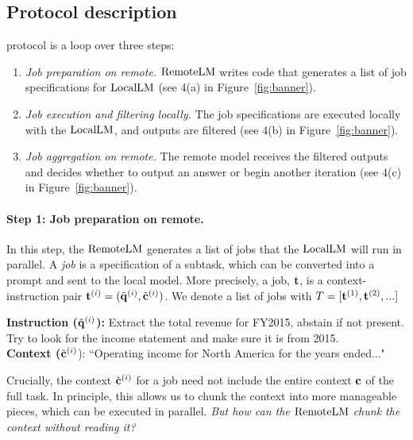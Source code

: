 \subsection{Protocol description}
\system protocol is a loop over three steps:
\begin{enumerate}
    \vspace{-0.5em}\item \textit{Job preparation on remote.}  $\mathrm{RemoteLM}$ writes code that generates a list of job specifications for $\mathrm{LocalLM}$ (see 4(a) in Figure~\ref{fig:banner}).
    \vspace{-0.5em}\item \textit{Job execution and filtering locally.} The job specifications are executed locally with the $\mathrm{LocalLM}$, and outputs are filtered (see 4(b) in Figure~\ref{fig:banner}).
    \vspace{-0.5em}\item \textit{Job aggregation on remote.} The remote model receives the filtered outputs and decides whether to output an answer or begin another iteration (see 4(c) in Figure~\ref{fig:banner}).
\end{enumerate}

\paragraph{Step 1: Job preparation on remote.} 
In this step, the $\mathrm{RemoteLM}$ generates a list of jobs that the $\mathrm{LocalLM}$ will run in parallel. A \textit{job} is a specification of a subtask, which can be converted into a prompt and sent to the local model. More precisely, a job, $\mathbf{t}$, is a context-instruction pair $\mathbf{t}^{(i)} = (\tilde{\mathbf{q}}^{(i)}, \tilde{\mathbf{c}}^{(i)})$. We denote a list of jobs with $T = [ \mathbf{t}^{(1)}, \mathbf{t}^{(2)}, ... ]$

\begin{examplebox}
    \small \textbf{Instruction ($\tilde{\mathbf{q}}^{(i)}$):} Extract the total revenue for FY2015, abstain if not present. Try to look for the income statement and make sure it is from 2015. \\
    \textbf{Context ($\tilde{\mathbf{c}}^{(i)}$}): ``Operating income for North America for the years ended..." 
\end{examplebox}


Crucially, the context $\tilde{\mathbf{c}}^{(i)}$ for a job need not include the entire context $\mathbf{c}$ of the full task. 
In principle, this allows us to chunk the context into more manageable pieces, which can be executed in parallel. 
\textit{But how can the $\mathrm{RemoteLM}$ chunk the context without reading it?}

